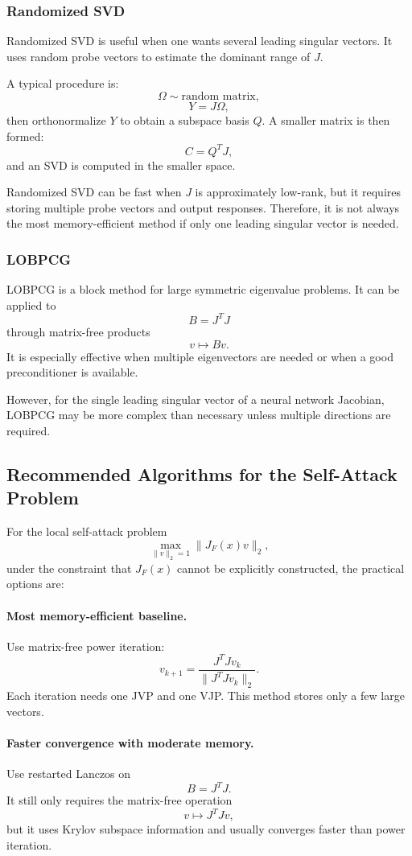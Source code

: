 \documentclass{article}
\begin{document}
\subsubsection{Randomized SVD}

Randomized SVD is useful when one wants several leading singular vectors. It uses random probe vectors to estimate the dominant range of \(J\).

A typical procedure is:
\[
\Omega\sim \text{random matrix},
\]
\[
Y=J\Omega,
\]
then orthonormalize \(Y\) to obtain a subspace basis \(Q\). A smaller matrix is then formed:
\[
C=Q^TJ,
\]
and an SVD is computed in the smaller space.

Randomized SVD can be fast when \(J\) is approximately low-rank, but it requires storing multiple probe vectors and output responses. Therefore, it is not always the most memory-efficient method if only one leading singular vector is needed.

\subsubsection{LOBPCG}

LOBPCG is a block method for large symmetric eigenvalue problems. It can be applied to
\[
B=J^TJ
\]
through matrix-free products
\[
v\mapsto Bv.
\]
It is especially effective when multiple eigenvectors are needed or when a good preconditioner is available.

However, for the single leading singular vector of a neural network Jacobian, LOBPCG may be more complex than necessary unless multiple directions are required.

\subsection{Recommended Algorithms for the Self-Attack Problem}

For the local self-attack problem
\[
\max_{\|v\|_2=1}\|J_F(x)v\|_2,
\]
under the constraint that \(J_F(x)\) cannot be explicitly constructed, the practical options are:

\paragraph{Most memory-efficient baseline.}
Use matrix-free power iteration:
\[
v_{k+1}
=
\frac{J^TJv_k}{\|J^TJv_k\|_2}.
\]
Each iteration needs one JVP and one VJP. This method stores only a few large vectors.

\paragraph{Faster convergence with moderate memory.}
Use restarted Lanczos on
\[
B=J^TJ.
\]
It still only requires the matrix-free operation
\[
v\mapsto J^TJv,
\]
but it uses Krylov subspace information and usually converges faster than power iteration.
\end{document}
